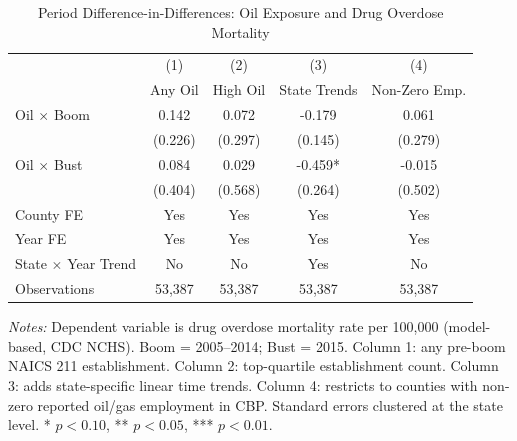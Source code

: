 \begin{table}[H]
\centering
\caption{Period Difference-in-Differences: Oil Exposure and Drug Overdose Mortality}
\begin{threeparttable}
\begin{tabular}{lcccc}
\toprule
 & (1) & (2) & (3) & (4) \\
 & Any Oil & High Oil & State Trends & Non-Zero Emp. \\
\midrule
Oil $\times$ Boom & 0.142 & 0.072 & -0.179 & 0.061 \\
 & (0.226) & (0.297) & (0.145) & (0.279) \\
Oil $\times$ Bust & 0.084 & 0.029 & -0.459* & -0.015 \\
 & (0.404) & (0.568) & (0.264) & (0.502) \\
\midrule
County FE & Yes & Yes & Yes & Yes \\
Year FE & Yes & Yes & Yes & Yes \\
State $\times$ Year Trend & No & No & Yes & No \\
Observations & 53,387 & 53,387 & 53,387 & 53,387 \\
\bottomrule
\end{tabular}
\begin{tablenotes}[flushleft]
\small
\item \textit{Notes:} Dependent variable is drug overdose mortality rate per 100,000 (model-based, CDC NCHS). Boom = 2005--2014; Bust = 2015. Column 1: any pre-boom NAICS 211 establishment. Column 2: top-quartile establishment count. Column 3: adds state-specific linear time trends. Column 4: restricts to counties with non-zero reported oil/gas employment in CBP. Standard errors clustered at the state level. * $p<0.10$, ** $p<0.05$, *** $p<0.01$.
\end{tablenotes}
\end{threeparttable}
\label{tab:did}
\end{table}

